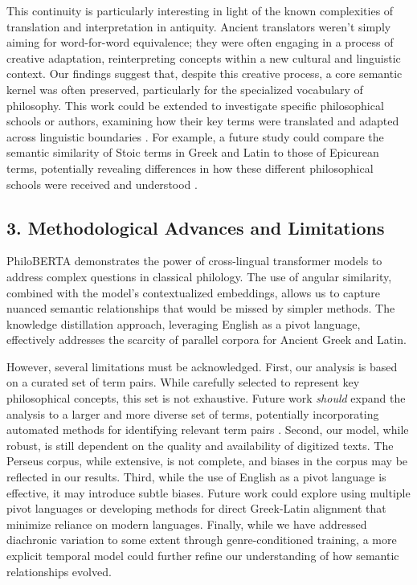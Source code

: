 \documentclass[11pt]{article} %
\begin{document}
This continuity is particularly interesting in light of the known complexities of translation and interpretation in antiquity.  Ancient translators weren't simply aiming for word-for-word equivalence; they were often engaging in a process of creative adaptation, reinterpreting concepts within a new cultural and linguistic context.  Our findings suggest that, despite this creative process, a core semantic kernel was often preserved, particularly for the specialized vocabulary of philosophy. This work could be extended to investigate specific philosophical schools or authors, examining how their key terms were translated and adapted across linguistic boundaries \cite{arzhanov2024porphyry}.  For example, a future study could compare the semantic similarity of Stoic terms in Greek and Latin to those of Epicurean terms, potentially revealing differences in how these different philosophical schools were received and understood \cite{delignon2025aristotle}.

\subsection*{3. Methodological Advances and Limitations}

PhiloBERTA demonstrates the power of cross-lingual transformer models to address complex questions in classical philology.  The use of angular similarity, combined with the model's contextualized embeddings, allows us to capture nuanced semantic relationships that would be missed by simpler methods. The knowledge distillation approach, leveraging English as a pivot language, effectively addresses the scarcity of parallel corpora for Ancient Greek and Latin.

However, several limitations must be acknowledged. First, our analysis is based on a curated set of term pairs. While carefully selected to represent key philosophical concepts, this set is not exhaustive.  Future work \textit{should} expand the analysis to a larger and more diverse set of terms, potentially incorporating automated methods for identifying relevant term pairs \cite{copeland2024translating}. Second, our model, while robust, is still dependent on the quality and availability of digitized texts.  The Perseus corpus, while extensive, is not complete, and biases in the corpus may be reflected in our results. Third, while the use of English as a pivot language is effective, it may introduce subtle biases.  Future work could explore using multiple pivot languages or developing methods for direct Greek-Latin alignment that minimize reliance on modern languages. Finally, while we have addressed diachronic variation to some extent through genre-conditioned training, a more explicit temporal model could further refine our understanding of how semantic relationships evolved.
\end{document}
